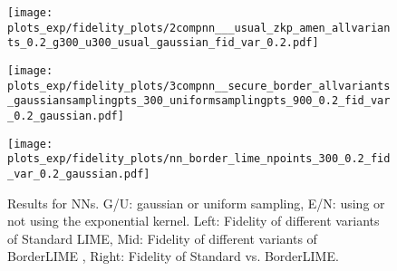 




\begin{figure*}[hbt!]
    \centering
    \begin{minipage}{0.35\linewidth}
        \centering
        \texttt{[image: plots\_exp/fidelity\_plots/2compnn\_\_\_usual\_zkp\_amen\_allvariants\_0.2\_g300\_u300\_usual\_gaussian\_fid\_var\_0.2.pdf]}
        \label{fig:simpvsorig_nn}
    \end{minipage}\hfill
    \begin{minipage}{0.35\linewidth}
        \centering
        \texttt{[image: plots\_exp/fidelity\_plots/3compnn\_\_secure\_border\_allvariants\_gaussiansamplingpts\_300\_uniformsamplingpts\_900\_0.2\_fid\_var\_0.2\_gaussian.pdf]}
        \label{fig:border_3comp_all_nn}
    \end{minipage}\hfill
    \begin{minipage}{0.29\linewidth}
        \centering
        \texttt{[image: plots\_exp/fidelity\_plots/nn\_border\_lime\_npoints\_300\_0.2\_fid\_var\_0.2\_gaussian.pdf]}
        \label{fig:borderlimevsnormal_nn_300}
    \end{minipage}\hfill
    \caption{Results for NNs. G/U: gaussian or uniform sampling, E/N: using or not using the exponential kernel. Left: Fidelity of different variants of Standard LIME, Mid: Fidelity of different variants of BorderLIME , Right: Fidelity of Standard vs. BorderLIME.}
    \label{fig:fidelity_plots_all}
\end{figure*}


